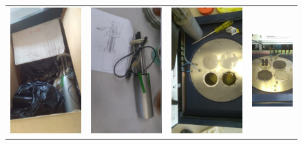 \documentclass[a0]{sciposter}
\begin{document}
\begin{multicols}{3}
	\begin{figure}
		\centering
		\begin{tabular}{cccc}
			\includegraphics[width=0.2\linewidth]{../Tesis/Figures/process/box1} & 
			\includegraphics[width=0.2\linewidth]{../Tesis/Figures/process/holder} &
			\includegraphics[width=0.2\linewidth]{../Tesis/Figures/process/p1} & 
			\includegraphics[width=0.2\linewidth]{../Tesis/Figures/process/p2} \\ 

\end{tabular}
\end{figure}
\end{multicols}
\end{document}
